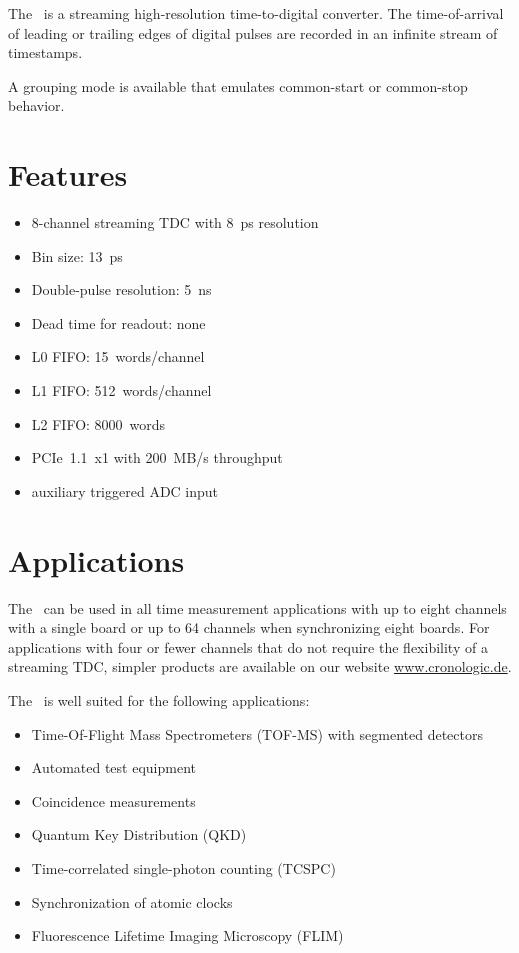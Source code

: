The \deviceName\ is a streaming high-resolution time-to-digital converter. 
The time-of-arrival of leading or trailing edges of digital pulses are
recorded in an infinite stream of timestamps.

A grouping mode is available that emulates common-start or common-stop
behavior. 

\section{Features}
	\begin{itemize}
		\item 8-channel streaming TDC with 8~ps resolution
		\item Bin size: 13~ps
		\item Double-pulse resolution: 5~ns
		\item Dead time for readout: none
		\item L0 FIFO: 15~words/channel
		\item L1 FIFO: 512~words/channel
		\item L2 FIFO: 8000~words
		\item PCIe~1.1~x1 with 200~MB/s throughput
		\item auxiliary triggered ADC input
	\end{itemize} 
\section{Applications}
The \deviceName\ can be used in all time measurement applications with up to
eight channels with a single board or up to 64 channels when synchronizing
eight boards. For applications with four or fewer channels that do not require
the flexibility of a streaming TDC, simpler products are available on our
website \href{https://www.cronologic.de/products/products-overview#tdcdata}{%
www.cronologic.de}.

The \deviceName\ is well suited for the following applications:
\begin{itemize}
	\item Time-Of-Flight Mass Spectrometers (TOF-MS) with segmented detectors
	\item Automated test equipment
	\item Coincidence measurements
	\item Quantum Key Distribution (QKD)
	\item Time-correlated single-photon counting (TCSPC)
	\item Synchronization of atomic clocks
	\item Fluorescence Lifetime Imaging Microscopy (FLIM)
\end{itemize} 